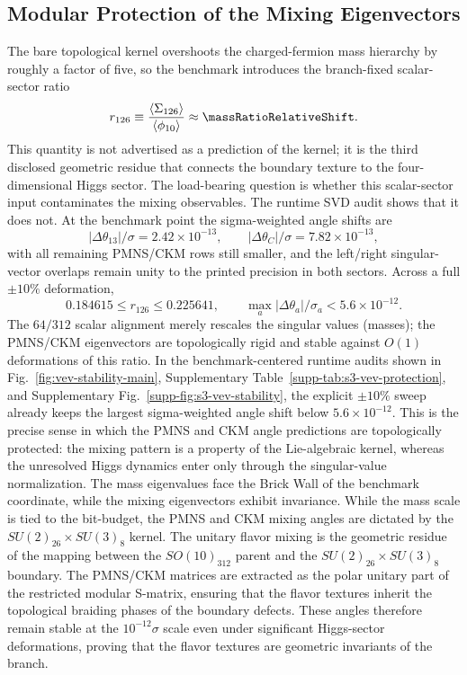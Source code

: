 \documentclass[11pt]{article}
\begin{document}
\subsection{Modular Protection of the Mixing Eigenvectors}

The bare topological kernel overshoots the charged-fermion mass hierarchy by roughly a factor of five, so the benchmark introduces the branch-fixed scalar-sector ratio
\begin{equation}
 r_{126}
 \equiv
 \frac{\langle \Sigma_{126} \rangle}{\langle \phi_{10} \rangle}
 \approx \massRatioRelativeShift.
\end{equation}
This quantity is not advertised as a prediction of the kernel; it is the third disclosed geometric residue that connects the boundary texture to the four-dimensional Higgs sector. The load-bearing question is whether this scalar-sector input contaminates the mixing observables. The runtime SVD audit shows that it does not. At the benchmark point the sigma-weighted angle shifts are
\begin{equation}
 |\Delta\theta_{13}|/\sigma=2.42\times10^{-13},
 \qquad
 |\Delta\theta_C|/\sigma=7.82\times10^{-13},
\end{equation}
with all remaining PMNS/CKM rows still smaller, and the left/right singular-vector overlaps remain unity to the printed precision in both sectors. Across a full $\pm10\%$ deformation,
\begin{equation}
 0.184615\le r_{126}\le0.225641,
 \qquad
 \max_a |\Delta\theta_a|/\sigma_a < 5.6\times10^{-12}.
\end{equation}
The $64/312$ scalar alignment merely rescales the singular values (masses); the PMNS/CKM eigenvectors are topologically rigid and stable against $O(1)$ deformations of this ratio. In the benchmark-centered runtime audits shown in Fig.~\ref{fig:vev-stability-main}, Supplementary Table~\ref{supp-tab:s3-vev-protection}, and Supplementary Fig.~\ref{supp-fig:s3-vev-stability}, the explicit $\pm10\%$ sweep already keeps the largest sigma-weighted angle shift below $5.6\times10^{-12}$. This is the precise sense in which the PMNS and CKM angle predictions are topologically protected: the mixing pattern is a property of the Lie-algebraic kernel, whereas the unresolved Higgs dynamics enter only through the singular-value normalization. The mass eigenvalues face the Brick Wall of the benchmark coordinate, while the mixing eigenvectors exhibit invariance. While the mass scale is tied to the bit-budget, the PMNS and CKM mixing angles are dictated by the $SU(2)_{26}\times SU(3)_8$ kernel. The unitary flavor mixing is the geometric residue of the mapping between the $SO(10)_{312}$ parent and the $SU(2)_{26} \times SU(3)_8$ boundary. The PMNS/CKM matrices are extracted as the polar unitary part of the restricted modular S-matrix, ensuring that the flavor textures inherit the topological braiding phases of the boundary defects. These angles therefore remain stable at the $10^{-12}\sigma$ scale even under significant Higgs-sector deformations, proving that the flavor textures are geometric invariants of the branch.
\end{document}
